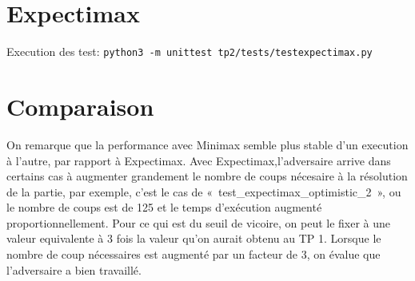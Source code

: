 \documentclass{article}
\begin{document}
    \section{Expectimax}

    Execution des test:
    \texttt{python3 -m unittest tp2/tests/testexpectimax.py}

    

    \section{Comparaison}

    On remarque que la performance avec Minimax semble plus stable d'un execution à l'autre, par rapport à Expectimax.
    Avec Expectimax,l'adversaire arrive dans certains cas à augmenter grandement le nombre de coups nécesaire à la résolution de la partie,
    par exemple, c'est le cas de «~test\_expectimax\_optimistic\_2~», ou le nombre de coups est de 125 et le temps d'exécution
    augmenté proportionnellement.
    Pour ce qui est du seuil de vicoire, on peut le fixer à une valeur equivalente à 3 fois la valeur qu'on aurait obtenu au TP 1.
    Lorsque le nombre de coup nécessaires est augmenté par un facteur de 3, on évalue que l'adversaire a bien travaillé.
\end{document}
